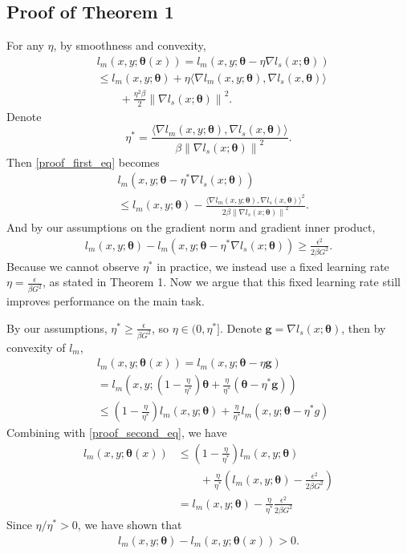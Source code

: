 \documentclass{article}
\theoremstyle{plain}
\theoremstyle{remark}
\theoremstyle{definition}
\newcommand{\grad}{\nabla}
\newcommand{\opt}{^*}
\def\norm#1{\left\| #1 \right\|}
\def\paren#1{\left( #1 \right)}
\def\eps{{\epsilon}}
\def\vtheta{{\bm{\theta}}}
\def\vg{{\bm{g}}}
\begin{document}
\subsection{Proof of Theorem 1}
\label{main_theorem_proof}
For any $\eta$, by smoothness and convexity,
\begin{align*}
\label{proof_first_eq}
&l_m(x,y; \vtheta(x))
= l_m(x,y; \vtheta - \eta \grad l_s(x; \vtheta))\\
&\leq l_m(x,y; \vtheta) 
+ \eta \langle \grad l_m(x, y; \vtheta), \grad l_s(x, \vtheta) \rangle \\
&\qquad+ \frac{\eta^2\beta}{2} \norm{\grad l_s(x; \vtheta)}^2.
\end{align*}
Denote
$$\eta\opt = \frac{\langle \grad l_m(x, y; \vtheta), \grad l_s(x, \vtheta) \rangle}
{\beta \norm{\grad l_s(x; \vtheta)}^2}.$$ 
Then \autoref{proof_first_eq} becomes
\begin{align}
&l_m(x,y; \vtheta - \eta\opt \grad l_s(x; \vtheta))\\
&\leq l_m(x,y; \vtheta) 
- \frac{\langle \grad l_m(x, y; \vtheta), \grad l_s(x, \vtheta) \rangle^2}
{2\beta \norm{\grad l_s(x; \vtheta)}^2}.
\end{align}
And by our assumptions on the gradient norm 
and gradient inner product,
\begin{align}
\label{proof_second_eq}
l_m(x,y; \vtheta)  - l_m(x,y; \vtheta - \eta\opt \grad l_s(x; \vtheta)) \geq\frac{\eps^2}{2\beta G^2}.
\end{align}
Because we cannot observe $\eta\opt$ in practice, we instead use a fixed learning rate $\eta = \frac{\eps}{\beta G^2}$, as stated in Theorem 1.
Now we argue that this fixed learning rate still improves performance on the main task.

By our assumptions, $\eta\opt \geq \frac{\eps}{\beta G^2}$, 
so $\eta \in (0, \eta\opt]$.
Denote $\vg = \grad l_s(x; \vtheta)$, then by convexity of $l_m$,
\begin{align}
&l_m(x,y; \vtheta(x))
= l_m(x,y; \vtheta - \eta \vg)\\
&= l_m\paren{x,y; 
	\paren{1 - \frac{\eta}{\eta\opt}} \vtheta +
	\frac{\eta}{\eta\opt} \paren{\vtheta - \eta\opt \vg}} \\
&\leq \paren{1 - \frac{\eta}{\eta\opt}} l_m(x,y; \vtheta) 
+ \frac{\eta}{\eta\opt} l_m(x,y; \vtheta - \eta\opt g)
\end{align}
Combining with \autoref{proof_second_eq}, we have
\begin{align*}
l_m(x,y; \vtheta(x))
&\leq \paren{1 - \frac{\eta}{\eta\opt}} l_m(x,y; \vtheta) \\
&\qquad
+ \frac{\eta}{\eta\opt} \paren{l_m(x,y; \vtheta) - \frac{\eps^2}{2\beta G^2}} \\
&= l_m(x,y; \vtheta) - \frac{\eta}{\eta\opt}\frac{\eps^2}{2\beta G^2}
\end{align*}
Since $\eta / \eta\opt > 0$, we have shown that
\begin{align}
l_m(x,y; \vtheta)  - l_m(x,y; \vtheta(x)) > 0.
\end{align}
\end{document}
